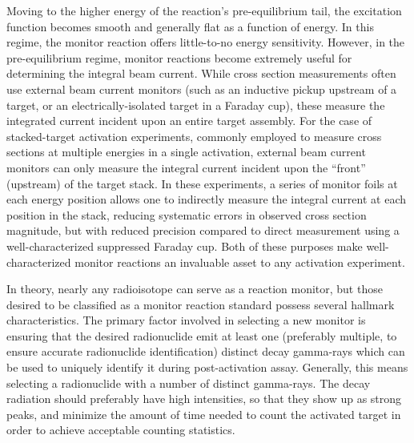 Moving to the higher energy  of the reaction's pre-equilibrium tail, the excitation function becomes  smooth and generally flat as a function of energy.
In this regime, the monitor reaction offers little-to-no energy sensitivity. 
However,  in the pre-equilibrium regime, monitor reactions become extremely useful for determining the integral beam current. 
While cross section measurements often use external beam current monitors (such as an inductive pickup upstream of a target, or an electrically-isolated target in a Faraday cup), these measure the integrated current incident upon an entire target assembly.
For the case of stacked-target activation experiments, commonly employed to measure cross sections at multiple energies  in a single activation, external beam current monitors can only measure the integral current incident upon the \enquote{front} (upstream) of the target stack.
In these experiments, a series of monitor foils at each energy position allows one to indirectly measure the integral current at each position in the stack, reducing systematic errors in observed cross section magnitude, but with reduced precision compared to direct measurement using a well-characterized suppressed Faraday cup.
Both of these purposes make well-characterized monitor reactions an invaluable asset to any activation experiment. 



In theory, nearly any radioisotope can serve as a reaction monitor, but those desired to be classified as a monitor reaction standard possess several hallmark characteristics.
The primary factor involved in selecting a new monitor is ensuring that the desired radionuclide emit  at least one (preferably multiple, to ensure accurate radionuclide identification) distinct decay gamma-rays which can be used to uniquely identify it during post-activation assay.  
Generally, this means selecting a radionuclide with a number of distinct gamma-rays.
The decay radiation should preferably have high intensities, so that they show up as strong peaks, and minimize the amount of time needed to count the activated target in order to achieve acceptable counting statistics. 


